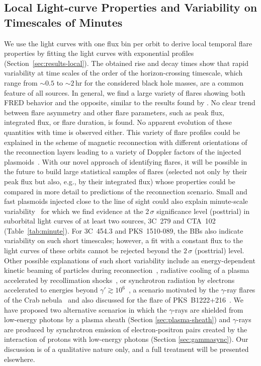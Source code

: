 \documentclass[twocolumn]{aastex62}
\newcommand{\Grays}{$\gamma$-rays\xspace}
\newcommand{\gray}{$\gamma$-ray\xspace}
\begin{document}
\subsection{Local Light-curve Properties and Variability on Timescales of Minutes}
We use the light curves with one flux bin per orbit to derive local temporal flare properties by fitting the light curves with exponential  profiles (Section~\ref{sec:results-local}).
The obtained rise and decay times show that rapid variability at time scales of the order of the horizon-crossing timescale, which range from $\sim 0.5$ to $\sim 2$\,hr for the considered black hole masses, are a common feature of all sources.
In general, we find a large variety of flares showing both FRED behavior and the opposite,
similar to the results found by \citet[][see their Figure 10]{2019MNRAS.482..743R}.
No clear trend between flare asymmetry and other flare parameters, such as peak flux, integrated flux, or flare duration, is found. 
No apparent evolution of these quantities with time is observed either. 
This variety of flare profiles could be explained in the scheme of magnetic reconnection with different orientations of the reconnection layers leading to a variety of Doppler factors of the injected plasmoids~\citep[e.g.,][]{2016MNRAS.462.3325P,2018MNRAS.tmp.2522C}. 
With our novel approach of identifying flares, it will be possible in the future to build large statistical samples of flares (selected not only by their peak flux but also, e.g., by their integrated flux) whose properties could be compared in more detail to predictions of the reconnection scenario.
Small and fast plasmoids injected close to the line of sight could also explain minute-scale variability~\citep{2016MNRAS.462.3325P} for which we find evidence at the 2\,$\sigma$ significance level (posttrial) in suborbital light curves of at least two sources, 3C~279 and CTA~102 (Table~\ref{tab:minute}). 
For 3C~454.3 and PKS~1510-089, the BBs also indicate variability on such short timescales; however, a fit with a constant flux to the light curves of these orbits cannot be rejected beyond the $2\,\sigma$ (posttrial) level.
Other possible explanations of such short variability include an energy-dependent kinetic beaming of particles during reconnection~\citep{2012ApJ...754L..33C}, radiative cooling of a plasma accelerated by recollimation shocks~\citep{Bodo:2017qqn}, or synchrotron radiation by electrons accelerated to energies beyond $\gamma' \gtrsim 10^6$~\citep{TheFermi-LAT:2016dss}, a scenario motivated by the \gray flares of the Crab nebula~\citep{2011Sci...331..739A} and also discussed for the flare of PKS~B1222+216~\citep{2012MNRAS.425.2519N}.
We have proposed two alternative scenarios in which the \Grays are shielded from low-energy photons by a plasma sheath (Section \ref{sec:plasma-sheath}) and \Grays are produced by synchrotron emission of electron-positron pairs created by the interaction of protons with low-energy photons (Section \ref{sec:gammasync}). Our discussion is of a qualitative nature only, and a full treatment will be presented elsewhere. 
\end{document}

